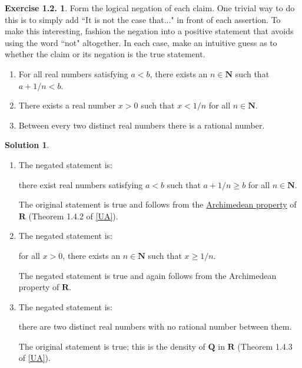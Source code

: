 \documentclass[12pt]{article}
\theoremstyle{definition}
\theoremstyle{exercise}
\newtheorem{exercise}{Exercise 1.2.}
\theoremstyle{solution}
\newtheorem*{solution}{Solution}
\begin{document}
\begin{exercise}
\label{ex:11}
    Form the logical negation of each claim. One trivial way to do this is to simply add ``It is not the case that..." in front of each assertion. To make this interesting, fashion the negation into a positive statement that avoids using the word ``not" altogether. In each case, make an intuitive guess as to whether the claim or its negation is the true statement.
    \begin{enumerate}[label = (\alph*)]
        \item For all real numbers satisfying \( a < b \), there exists an \( n \in \mathbf{N} \) such that \( a + 1/n < b \).

        \item There exists a real number \( x > 0 \) such that \( x < 1/n \) for all \( n \in \mathbf{N} \).

        \item Between every two distinct real numbers there is a rational number.
    \end{enumerate}
\end{exercise}

\begin{solution}
    \begin{enumerate}[label = (\alph*)]
        \item The negated statement is:
        \begin{center}
            there exist real numbers satisfying \( a < b \) such that \( a + 1/n \geq b \) for all \( n \in \mathbf{N} \).
        \end{center}
        The original statement is true and follows from the \href{https://en.wikipedia.org/wiki/Archimedean_property}{Archimedean property} of \( \mathbf{R} \) (Theorem 1.4.2 of \hyperlink{ua}{[UA]}).

        \item The negated statement is:
        \begin{center}
            for all \( x > 0 \), there exists an \( n \in \mathbf{N} \) such that \( x \geq 1/n \).
        \end{center}
        The negated statement is true and again follows from the Archimedean property of \( \mathbf{R} \).

        \item The negated statement is:
        \begin{center}
            there are two distinct real numbers with no rational number between them.
        \end{center}
        The original statement is true; this is the density of \( \mathbf{Q} \) in \( \mathbf{R} \) (Theorem 1.4.3 of \hyperlink{ua}{[UA]}).
    \end{enumerate}
\end{solution}
\end{document}

